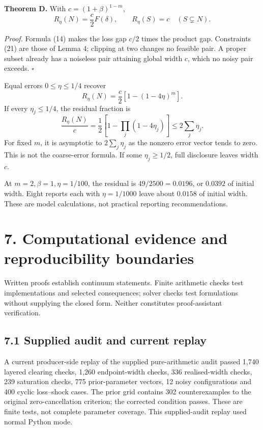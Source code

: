 \documentclass[
  british,
  11pt,
  a4paper,
]{article}
\begin{document}
\textbf{Theorem D.} With \(c=(1+\beta)^{1-m}\), \[
R_\eta(N)=\frac c2F(\delta),\qquad R_\eta(S)=c\quad(S\subsetneq N).
\tag{23}
\]

\emph{Proof.} Formula (14) makes the loss gap \(c/2\) times the product
gap. Constraints (21) are those of Lemma 4; clipping at two changes no
feasible pair. A proper subset already has a noiseless pair attaining
global width \(c\), which no noisy pair exceeds. \(\square\)

Equal errors \(0\le\eta\le1/4\) recover \[
R_\eta(N)=\frac c2[1-(1-4\eta)^m].
\tag{24}
\] If every \(\eta_j\le1/4\), the residual fraction is \[
\frac{R_\eta(N)}c=\frac12[1-\prod_j(1-4\eta_j)]\le2\sum_j\eta_j.
\] For fixed \(m\), it is asymptotic to \(2\sum_j\eta_j\) as the nonzero
error vector tends to zero. This is not the coarse-error formula. If
some \(\eta_j\ge1/2\), full disclosure leaves width \(c\).

At \(m=2,\beta=1,\eta=1/100\), the residual is \(49/2500=0.0196\), or
\(0.0392\) of initial width. Eight reports each with \(\eta=1/1000\)
leave about \(0.0158\) of initial width. These are model calculations,
not practical reporting recommendations.

\section{7. Computational evidence and reproducibility
boundaries}\label{computational-evidence-and-reproducibility-boundaries}

Written proofs establish continuum statements. Finite arithmetic checks
test implementations and selected consequences; solver checks test
formulations without supplying the closed form. Neither constitutes
proof-assistant verification.

\subsection{7.1 Supplied audit and current
replay}\label{supplied-audit-and-current-replay}

A current producer-side replay of the supplied pure-arithmetic audit
passed 1,740 layered clearing checks, 1,260 endpoint-width checks, 336
realised-width checks, 239 saturation checks, 775 prior-parameter
vectors, 12 noisy configurations and 400 cyclic loss--shock cases. The
prior grid contains 302 counterexamples to the original
zero-cancellation criterion; the corrected condition passes. These are
finite tests, not complete parameter coverage. This supplied-audit
replay used normal Python mode.
\end{document}
